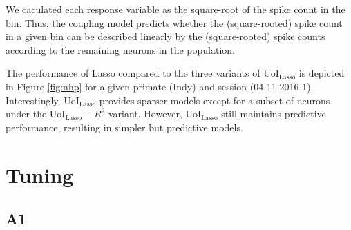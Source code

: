 \documentclass[11pt]{article}
\begin{document}
We caculated each response variable as the square-root of the spike count in the bin. Thus, the coupling model predicts whether the (square-rooted) spike count in a given bin can be described linearly by the (square-rooted) spike counts according to the remaining neurons in the population. 

The performance of Lasso compared to the three variants of UoI$_{\text{Lasso}}$ is depicted in Figure \ref{fig:nhp} for a given primate (Indy) and session (04-11-2016-1). Interestingly, UoI$_{\text{Lasso}}$ provides sparser models except for a subset of neurons under the UoI$_{\text{Lasso}}-R^2$ variant. However, UoI$_{\text{Lasso}}$ still maintains predictive performance, resulting in simpler but predictive models.\\

\newpage

\section{Tuning}
\subsection{A1}
\end{document}
